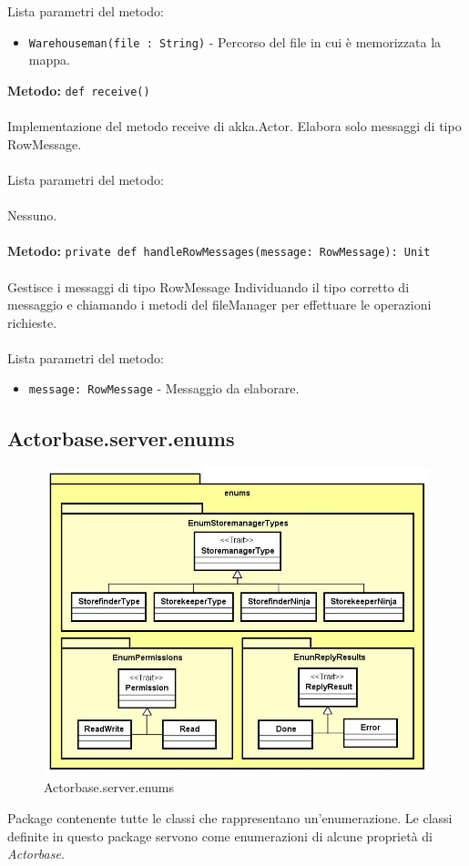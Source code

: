 \documentclass[a4paper]{article}
\begin{document}
		Lista parametri del metodo:
			\begin{itemize}
				\item \texttt{Warehouseman(file : String)} - Percorso del file in cui è memorizzata la mappa.
			\end{itemize}
		\textbf{Metodo: }\texttt{def receive()}
			\\ \\
		Implementazione del metodo receive di akka.Actor. Elabora solo messaggi di tipo RowMessage.
			\\ \\
		Lista parametri del metodo:
			\\ \\
			Nessuno.
			\\ \\
		\textbf{Metodo: }\texttt{private def handleRowMessages(message: RowMessage): Unit}
			\\ \\
		Gestisce i messaggi di tipo RowMessage Individuando il tipo corretto di messaggio e chiamando i metodi del fileManager per effettuare le operazioni richieste.
			\\ \\
		Lista parametri del metodo:
			\begin{itemize}
				\item \texttt{message: RowMessage} - Messaggio da elaborare.
			\end{itemize}
			
		\subsection{Actorbase.server.enums}
		\begin{figure}[H]
			\centering
			\includegraphics[scale = 0.6]{Server/enumsLevel.jpg}
			\caption{Actorbase.server.enums}
		\end{figure}
		Package contenente tutte le classi che rappresentano un'enumerazione. Le classi definite in questo package servono come enumerazioni di alcune proprietà di \emph{Actorbase}.
		
\end{document}
